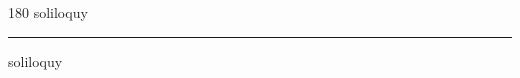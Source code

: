 
\begin{frame}
\begin{center}
\begin{turn}{180}
{\fontsize{2.5cm}{1em}\selectfont soliloquy}
\end{turn}
\vspace{1em}\par  
\hrule
\vspace{1em}\par  
{\fontsize{2.5cm}{1em}\selectfont soliloquy}
\end{center}
\end{frame}
